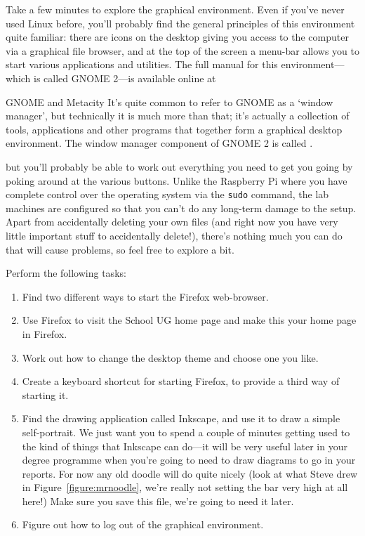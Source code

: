 Take a few minutes to explore the graphical environment. Even if you've never used Linux before, you'll probably find the general principles of this environment quite familiar: there are icons on the desktop giving you access to the computer via a graphical file browser, and at the top of the screen a menu-bar allows you to start various applications and utilities. The full manual for this environment---which is called GNOME 2---is available online at 

\noindent{}

\begin{linux}{GNOME and Metacity}
It's quite common to refer to GNOME as a `window manager', but technically it is much more than that; it's actually a collection of tools, applications and other programs that together form a graphical desktop environment. The window manager component of GNOME 2 is called .
\end{linux} 

\noindent but you'll probably be able to work out everything you need to get you going by poking around at the various buttons. Unlike the Raspberry Pi where you have complete control over the operating system via the \texttt{sudo} command, the lab machines are configured so that you can't do any long-term damage to the setup. Apart from accidentally deleting your own files (and right now you have very little important stuff to accidentally delete!), there's nothing much you can do that will cause problems, so feel free to explore a bit. 

Perform the following tasks:
\begin{enumerate}
\item Find two different ways to start the Firefox web-browser.
\item Use Firefox to visit the School UG home page
   and make this your
  home page in Firefox.
\item Work out how to change the desktop theme and choose one you like.
\item Create a keyboard shortcut for starting Firefox, to provide a third way of starting it.
\item Find the  drawing application called Inkscape, and use it to draw a simple self-portrait. We just want you to spend a couple of minutes getting used to the kind of things that Inkscape can do---it will be very useful later in your degree programme when you're going to need to draw diagrams to go in your reports. For now any old doodle will do quite nicely (look at what Steve drew in Figure~\ref{figure:mrnoodle}, we're really not setting the bar very high at all here!) Make sure you save this file, we're going to need it later.
\item Figure out how to log out of the graphical environment. \label{list:logout}
\end{enumerate}

